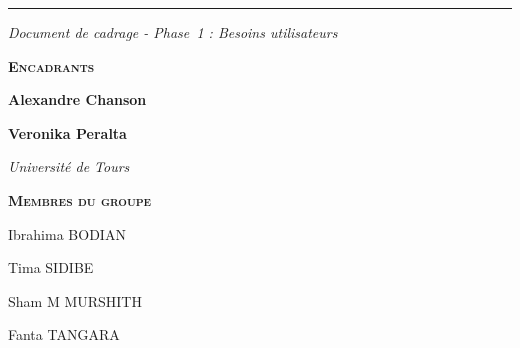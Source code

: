 \documentclass[a4paper,11pt]{article}
\begin{document}
\begin{titlepage}
  {\color{watercyan}\rule{4cm}{1pt}\par}

  \vspace{0.6cm}

  {\color{txtgrey}\itshape\normalsize
    Document de cadrage - Phase~1 : Besoins utilisateurs\par}

  \vfill

  \begin{minipage}[t]{0.48\textwidth}
    \raggedright
    {\color{utblue}\bfseries\scshape\normalsize Encadrants\par}
    \vspace{0.2em}
    {\color{txtdark}\normalsize\bfseries Alexandre Chanson\par}
    {\color{txtdark}\normalsize\bfseries Veronika Peralta\par}
    \vspace{0.1em}
    {\color{txtgrey}\itshape\small Université de Tours\par}
  \end{minipage}%
  \hfill
  \begin{minipage}[t]{0.48\textwidth}
    \raggedleft
    {\color{envgreen}\bfseries\scshape\normalsize Membres du groupe\par}
    \vspace{0.2em}
    {\color{txtdark}\normalsize Ibrahima BODIAN \par}
    {\color{txtdark}\normalsize Tima SIDIBE \par}
    {\color{txtdark}\normalsize Sham M MURSHITH \par}
    {\color{txtdark}\normalsize Fanta TANGARA\par}
  \end{minipage}

  \vspace{1.2cm}

\end{titlepage}

\pagestyle{fancy}

\tableofcontents
\newpage

\end{document}
